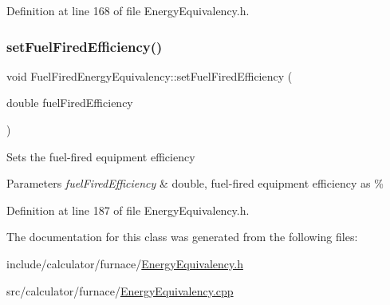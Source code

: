 Definition at line 168 of file Energy\+Equivalency.\+h.

\mbox{\label{class_fuel_fired_energy_equivalency_a510b4a7c1231faeeebca02fa0b1723ae}} 
\subsubsection{\texorpdfstring{set\+Fuel\+Fired\+Efficiency()}{setFuelFiredEfficiency()}}
{\footnotesize\ttfamily void Fuel\+Fired\+Energy\+Equivalency\+::set\+Fuel\+Fired\+Efficiency (\begin{DoxyParamCaption}\item[{double}]{fuel\+Fired\+Efficiency }\end{DoxyParamCaption})\hspace{0.3cm}{\ttfamily [inline]}}

Sets the fuel-\/fired equipment efficiency


\begin{DoxyParams}{Parameters}
{\em fuel\+Fired\+Efficiency} & double, fuel-\/fired equipment efficiency as \% \\
\hline
\end{DoxyParams}


Definition at line 187 of file Energy\+Equivalency.\+h.



The documentation for this class was generated from the following files\+:\begin{DoxyCompactItemize}
\item 
include/calculator/furnace/\hyperlink{_energy_equivalency_8h}{Energy\+Equivalency.\+h}\item 
src/calculator/furnace/\hyperlink{_energy_equivalency_8cpp}{Energy\+Equivalency.\+cpp}\end{DoxyCompactItemize}
